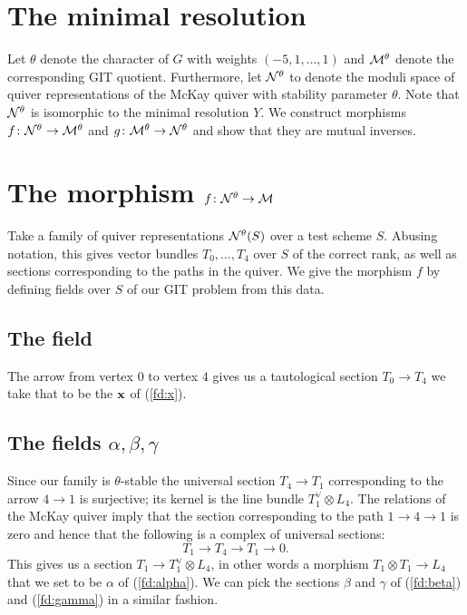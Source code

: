 \documentclass{amsart}
\theoremstyle{definition}
\begin{document}
\section{The minimal resolution}

Let $\theta$ denote the character of $G$ with weights $(-5,1,\ldots,1)$ and $\mathcal{M}^\theta$ denote the corresponding GIT quotient.
Furthermore, let $\mathcal{N}^\theta$ to denote the moduli space of quiver representations of the McKay quiver with stability parameter $\theta$.
Note that $\mathcal{N}^\theta$ is isomorphic to the minimal resolution $Y$.
We construct morphisms $f \colon \mathcal{N}^\theta \rightarrow \mathcal{M}^\theta$ and $g \colon \mathcal{M}^\theta \rightarrow \mathcal{N}^\theta$ and show that they are mutual inverses.

\section{The morphism $f \colon \mathcal{N}^\theta \rightarrow \mathcal{M}$}

Take a family of quiver representations $\mathcal{N}^\theta(S)$ over a test scheme $S$.
Abusing notation, this gives vector bundles $T_0, \ldots, T_4$ over $S$ of the correct rank, as well as sections corresponding to the paths in the quiver.
We give the morphism $f$ by defining fields over $S$ of our GIT problem from this data.

\subsection{The field \bfx}

The arrow from vertex $0$ to vertex $4$ gives us a tautological section $T_0 \rightarrow T_4$ we take that to be the $\mathbf{x}$ of (\ref{fd:x}).

\subsection{The fields $\alpha, \beta, \gamma$}

Since our family is $\theta$-stable the universal section $T_4 \rightarrow T_1$ corresponding to the arrow $4 \rightarrow 1$ is surjective; its kernel is the line bundle $T_1^\vee \otimes L_4$.
The relations of the McKay quiver imply that the section corresponding to the path $1 \rightarrow 4 \rightarrow 1$ is zero and hence that the following is a complex of universal sections:
$$T_1 \rightarrow T_4 \rightarrow T_1 \rightarrow 0.$$
This gives us a section $T_1 \rightarrow T_1^\vee \otimes L_4$, in other words a morphism $T_1 \otimes T_1 \rightarrow L_4$ that we set to be $\alpha$ of (\ref{fd:alpha}).
We can pick the sections $\beta$ and $\gamma$ of (\ref{fd:beta}) and (\ref{fd:gamma}) in a similar fashion.
\end{document}
